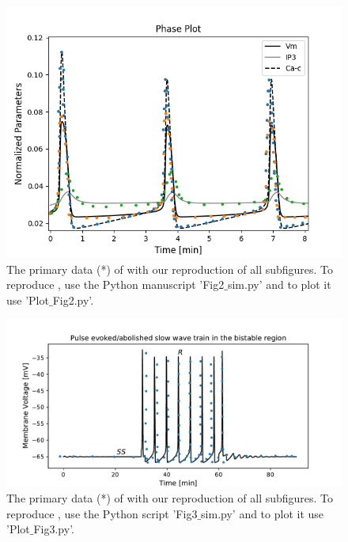 \documentclass[fleqn,10pt]{physiome}
\begin{document}
\begin{figure}[ht!]%
\includegraphics[width=1.0\linewidth]{Figure_2.png}
\caption{The primary data (*) of \cite[Figure 2A]{imtiaz2002theoretical} with our reproduction of all subfigures. To reproduce \cite[Figure 2A]{imtiaz2002theoretical}, use the Python manuscript 'Fig2$\_$sim.py' and to plot it use 'Plot$\_$Fig2.py'.}
\label{fig:fig2}
\end{figure}

\begin{figure}[ht!]%
\includegraphics[width=1.0\linewidth]{Figure_3.pdf}
\caption{The primary data (*) of \cite[Figure 3A]{imtiaz2002theoretical} with our reproduction of all subfigures. To reproduce \cite[Figure 3A]{imtiaz2002theoretical}, use the Python script 'Fig3$\_$sim.py' and to plot it use 'Plot$\_$Fig3.py'.}
\label{fig:fig3}
\end{figure}
\end{document}
